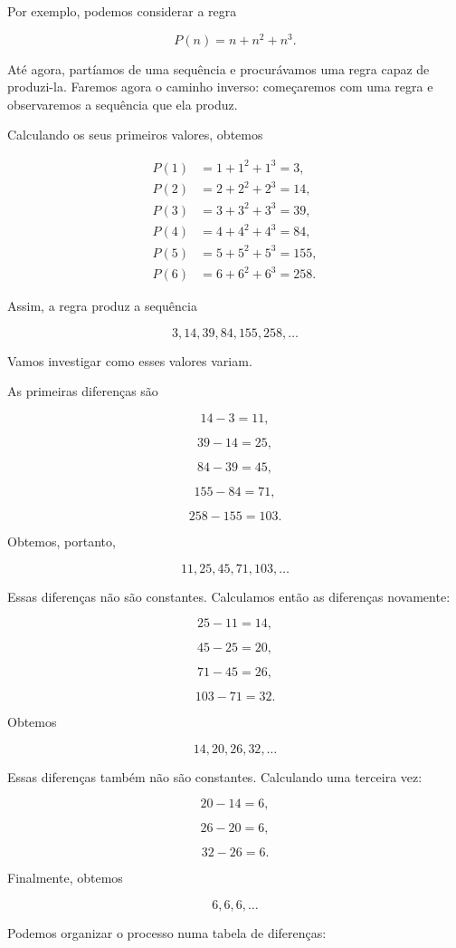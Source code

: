 \documentclass[12pt,a4paper]{article}
\begin{document}
Por exemplo, podemos considerar a regra

\[
P(n)=n+n^2+n^3.
\]

Até agora, partíamos de uma sequência e procurávamos uma regra capaz de
produzi-la. Faremos agora o caminho inverso: começaremos com uma regra e
observaremos a sequência que ela produz.

Calculando os seus primeiros valores, obtemos

\[
\begin{aligned}
P(1)&=1+1^2+1^3=3,\\
P(2)&=2+2^2+2^3=14,\\
P(3)&=3+3^2+3^3=39,\\
P(4)&=4+4^2+4^3=84,\\
P(5)&=5+5^2+5^3=155,\\
P(6)&=6+6^2+6^3=258.
\end{aligned}
\]

Assim, a regra produz a sequência

\[
3,14,39,84,155,258,\ldots
\]

Vamos investigar como esses valores variam.

As primeiras diferenças são

\[
14-3=11,
\]

\[
39-14=25,
\]

\[
84-39=45,
\]

\[
155-84=71,
\]

\[
258-155=103.
\]

Obtemos, portanto,

\[
11,25,45,71,103,\ldots
\]

Essas diferenças não são constantes. Calculamos então as diferenças
novamente:

\[
25-11=14,
\]

\[
45-25=20,
\]

\[
71-45=26,
\]

\[
103-71=32.
\]

Obtemos

\[
14,20,26,32,\ldots
\]

Essas diferenças também não são constantes. Calculando uma terceira
vez:

\[
20-14=6,
\]

\[
26-20=6,
\]

\[
32-26=6.
\]

Finalmente, obtemos

\[
6,6,6,\ldots
\]

Podemos organizar o processo numa tabela de diferenças:
\end{document}
